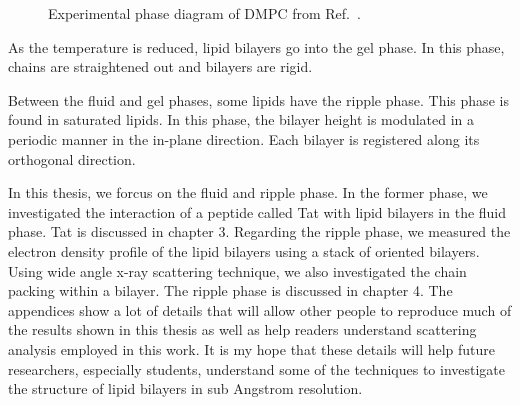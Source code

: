 \begin{figure}
  \centering
  \caption{Experimental phase diagram of DMPC from Ref.~\cite{ref:Janiak76}.}
  \label{fig:phase_diagram}
\end{figure}

As the temperature is reduced, lipid bilayers go into the gel phase.
In this phase, chains are straightened out and bilayers are rigid.

Between the fluid and gel phases, some lipids have the ripple phase.
This phase is found in saturated lipids. In this phase, the bilayer
height is modulated in a periodic manner in the in-plane direction.
Each bilayer is registered along its orthogonal direction.

In this thesis, we forcus on the fluid and ripple phase. In the former phase,
we investigated the interaction of a peptide called Tat with lipid bilayers
in the fluid phase. 
Tat is discussed in chapter 3.
Regarding the ripple phase, we measured the electron density profile of the lipid
bilayers using a stack of oriented bilayers. Using wide angle x-ray scattering
technique, we also investigated the chain packing within a bilayer. 
The ripple phase is discussed in chapter 4. 
The appendices show a lot of details that will
allow other people to reproduce much of the results shown in this thesis 
as well as help readers understand scattering analysis employed in this work.
It is my hope that these details will help future researchers,
especially students, understand some of the techniques to investigate the
structure of lipid bilayers in sub Angstrom resolution.